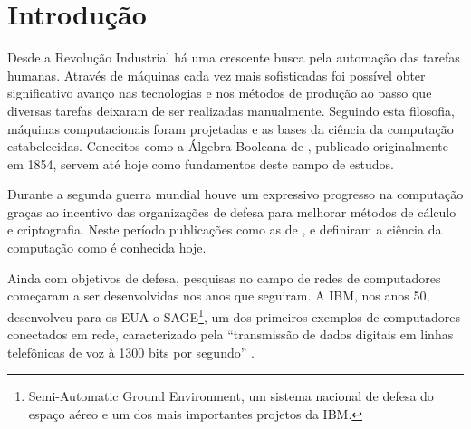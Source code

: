 \documentclass[twoside,english,brazilian]{UNISINOSmonografia}
\begin{document}
\chapter{Introdução}

{}


	Desde a Revolução Industrial há uma crescente busca pela automação das 
	tarefas humanas. Através de máquinas cada vez mais sofisticadas foi 
	possível obter significativo avanço nas tecnologias e nos métodos de 
	produção ao passo que diversas tarefas deixaram de ser realizadas 
	manualmente.
	Seguindo esta filosofia, máquinas computacionais foram projetadas e as 
	bases da ciência da computação estabelecidas. Conceitos como a 
	Álgebra Booleana de , publicado originalmente em 
	1854, servem até hoje como fundamentos deste campo de estudos.

	Durante a segunda guerra mundial houve um expressivo progresso na 
	computação graças ao incentivo das organizações de defesa para melhorar 
	métodos de cálculo e criptografia. Neste período publicações como as de 
	,  e 
	 definiram a ciência da computação como é 
	conhecida hoje.

	Ainda com objetivos de defesa, pesquisas no campo de redes de computadores 
	começaram a ser desenvolvidas nos anos que seguiram. A IBM, nos anos 50,
	desenvolveu para os EUA o SAGE\footnote{Semi-Automatic Ground Environment, 
	um sistema nacional de defesa do espaço aéreo e um dos mais importantes 
	projetos da IBM. 
	}, 
	um dos primeiros exemplos de computadores conectados em rede, 
	caracterizado pela ``transmissão de dados digitais em linhas telefônicas 
	de voz à 1300 bits por segundo'' \cite{IBMSAGE1983}.
\end{document}
